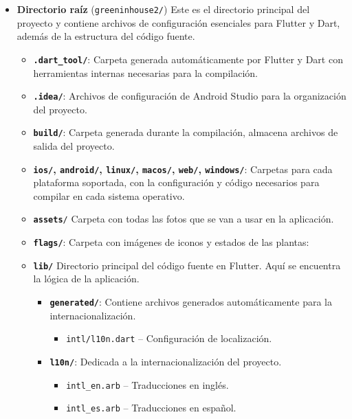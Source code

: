 \begin{itemize}
    \item {\textbf{Directorio raíz} (\texttt{greeninhouse2/})}
    Este es el directorio principal del proyecto y contiene archivos de configuración esenciales para Flutter y Dart, además de la estructura del código fuente.

    \begin{itemize}
    \item \textbf{\texttt{.dart\_tool/}}: Carpeta generada automáticamente por Flutter y Dart con herramientas internas necesarias para la compilación.
    \item \textbf{\texttt{.idea/}}: Archivos de configuración de Android Studio para la organización del proyecto.
    \item \textbf{\texttt{build/}}: Carpeta generada durante la compilación, almacena archivos de salida del proyecto.
    \item \textbf{\texttt{ios/}, \texttt{android/}, \texttt{linux/}, \texttt{macos/}, \texttt{web/}, \texttt{windows/}}: Carpetas para cada plataforma soportada, con la configuración y código necesarios para compilar en cada sistema operativo.

    \item \texttt{\textbf{assets}/} Carpeta con todas las fotos que se van a usar en la aplicación.
    \item \textbf{\texttt{flags/}}: Carpeta con imágenes de iconos y estados de las plantas:

    \item{\texttt{\textbf{lib/}}}
    Directorio principal del código fuente en Flutter. Aquí se encuentra la lógica de la aplicación.
    \begin{itemize}
    \item \textbf{\texttt{generated/}}: Contiene archivos generados automáticamente para la internacionalización.
    \begin{itemize}
        \item \texttt{intl/l10n.dart} – Configuración de localización.
    \end{itemize}
    \item \textbf{\texttt{l10n/}}: Dedicada a la internacionalización del proyecto.
    \begin{itemize}
        \item \texttt{intl\_en.arb} – Traducciones en inglés.
        \item \texttt{intl\_es.arb} – Traducciones en español.
    \end{itemize}


\end{itemize}
\end{itemize}
\end{itemize}
